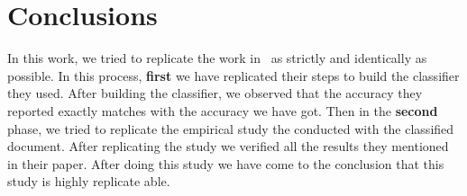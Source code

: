 \section{Conclusions}
\label{sect:conclusions}
In this work, we tried to replicate the work in~\cite{Brunet2014a} as strictly and identically as possible. In this process, \noindent\textbf{first} we have replicated their steps to build the classifier they used. After building the classifier, we observed that the accuracy they reported exactly matches with the accuracy we have got. Then in the \noindent\textbf{second} phase, we tried to replicate the empirical study the conducted with the classified document. After replicating the study we verified all the results they mentioned in their paper. After doing this study we have come to the conclusion that this study is highly replicate able.    
